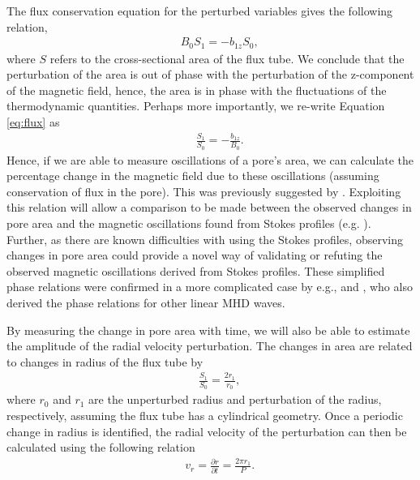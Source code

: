     The flux conservation equation for the perturbed variables gives the following relation,
    \begin{align}
        &&B_0S_1=-b_{1z}S_0,
        \label{eq:flux}
    \end{align}
    where $S$ refers to the cross-sectional area of the flux tube.
    We conclude that the perturbation of the area is out of phase with the perturbation of the  z-component of the magnetic field, hence, the area is in phase with the fluctuations of the thermodynamic quantities.
    Perhaps more importantly, we re-write Equation \ref{eq:flux} as
    \begin{align}
        &&\frac{S_1}{S_0}=-\frac{b_{1z}}{B_0}.
        \label{eq:mag_area}
    \end{align}
    Hence, if we are able to measure oscillations of a pore's area, we can calculate the percentage change in the magnetic field due to these oscillations (assuming conservation of flux in the pore).
    This was previously suggested by \cite{0004-637X-806-1-132}.
    Exploiting this relation will allow a comparison to be made between the observed changes in pore area and the magnetic oscillations found from Stokes profiles (e.g. \citealp{Balthasar2000}).
    Further, as there are known difficulties with using the Stokes profiles, observing changes in pore area could provide a novel way of validating or refuting the observed magnetic oscillations derived from Stokes profiles.
    These simplified phase relations were confirmed in a more complicated case by e.g., \cite{Moreels2013} and \cite{Moreels2013b}, who also derived the phase relations for other linear MHD waves. 
    
    By measuring the change in pore area with time, we will also be able to estimate the amplitude of the radial velocity perturbation.
    The changes in area are related to changes in radius of the flux tube by
    \begin{align}
        &&\frac{S_1}{S_0}=\frac{2r_1}{r_0},
        \label{eq:area_rad}
    \end{align}
    where $r_0$ and $r_1$ are the unperturbed radius and perturbation of the radius, respectively, assuming the flux tube has a cylindrical geometry.
    Once a periodic change in radius is identified, the radial velocity of the perturbation can then be calculated using the following relation
    \begin{align}
        &&v_r=\frac{\partial r}{\partial t}=\frac{2\pi r_1}{P}.
        \label{eq:rad_vel}
    \end{align}
  
